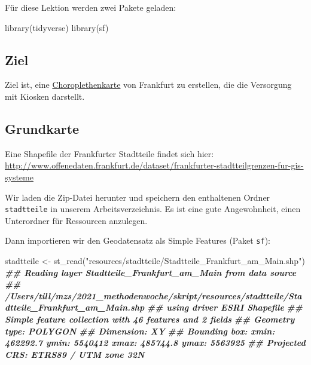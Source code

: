 \documentclass[11pt,german,a4paper]{article}
\newenvironment{Shaded}{\begin{snugshade}}{\end{snugshade}}
\newcommand{\DocumentationTok}[1]{\textcolor[rgb]{0.56,0.35,0.01}{\textbf{\textit{#1}}}}
\newcommand{\FunctionTok}[1]{\textcolor[rgb]{0.00,0.00,0.00}{#1}}
\newcommand{\NormalTok}[1]{#1}
\newcommand{\OtherTok}[1]{\textcolor[rgb]{0.56,0.35,0.01}{#1}}
\newcommand{\StringTok}[1]{\textcolor[rgb]{0.31,0.60,0.02}{#1}}
\begin{document}
Für diese Lektion werden zwei Pakete geladen:

\begin{Shaded}
\begin{Highlighting}[]
\FunctionTok{library}\NormalTok{(tidyverse)}
\FunctionTok{library}\NormalTok{(sf)}
\end{Highlighting}
\end{Shaded}

\hypertarget{ziel}{%
\subsection{Ziel}\label{ziel}}

Ziel ist, eine \href{https://de.wikipedia.org/wiki/Choroplethenkarte}{Choroplethenkarte} von Frankfurt zu erstellen, die die Versorgung mit Kiosken darstellt.

\hypertarget{grundkarte}{%
\subsection{Grundkarte}\label{grundkarte}}

Eine Shapefile der Frankfurter Stadtteile findet sich hier: \url{http://www.offenedaten.frankfurt.de/dataset/frankfurter-stadtteilgrenzen-fur-gis-systeme}

Wir laden die Zip-Datei herunter und speichern den enthaltenen Ordner \texttt{stadtteile} in unserem Arbeitsverzeichnis. Es ist eine gute Angewohnheit, einen Unterordner für Ressourcen anzulegen.

Dann importieren wir den Geodatensatz als Simple Features (Paket \texttt{sf}):

\begin{Shaded}
\begin{Highlighting}[]
\NormalTok{stadtteile }\OtherTok{\textless{}{-}} \FunctionTok{st\_read}\NormalTok{(}\StringTok{"resources/stadtteile/Stadtteile\_Frankfurt\_am\_Main.shp"}\NormalTok{)}
\DocumentationTok{\#\# Reading layer \textasciigrave{}Stadtteile\_Frankfurt\_am\_Main\textquotesingle{} from data source }
\DocumentationTok{\#\#   \textasciigrave{}/Users/till/mzs/2021\_methodenwoche/skript/resources/stadtteile/Stadtteile\_Frankfurt\_am\_Main.shp\textquotesingle{} }
\DocumentationTok{\#\#   using driver \textasciigrave{}ESRI Shapefile\textquotesingle{}}
\DocumentationTok{\#\# Simple feature collection with 46 features and 2 fields}
\DocumentationTok{\#\# Geometry type: POLYGON}
\DocumentationTok{\#\# Dimension:     XY}
\DocumentationTok{\#\# Bounding box:  xmin: 462292.7 ymin: 5540412 xmax: 485744.8 ymax: 5563925}
\DocumentationTok{\#\# Projected CRS: ETRS89 / UTM zone 32N}
\end{Highlighting}
\end{Shaded}
\end{document}
